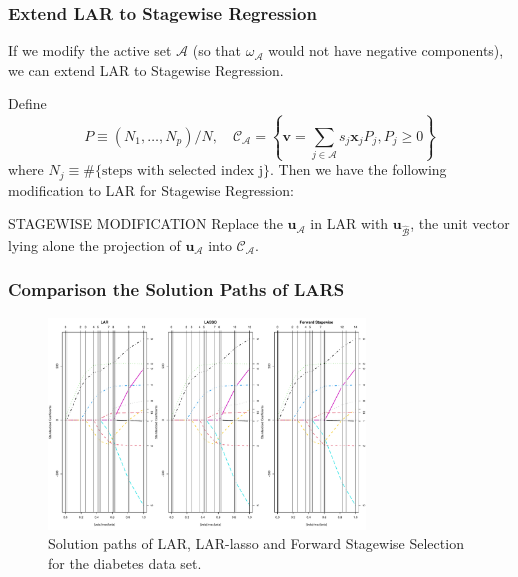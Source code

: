 \begin{frame}
\frametitle{Extend LAR to Stagewise Regression}
If we modify the active set $\mathcal{A}$ (so that $\omega_\mathcal{A}$ would not have negative components), we can extend LAR to Stagewise Regression.

Define
$$P\equiv(N_1,\dots,N_p)/N, \quad \mathcal{C}_{\mathcal{A}}=\left\{\mathbf{v}=\sum_{j\in\mathcal{A}}s_j \mathbf{x}_j P_j, P_j\geq 0\right\}$$ 
where $N_j\equiv \#\{\text{steps with selected index j}\}$. Then we have the following modification to LAR for Stagewise Regression:

\begin{block}{STAGEWISE MODIFICATION}
Replace the $\mathbf{u}_{\mathcal{A}}$ in LAR with $\mathbf{u}_{\hat{\mathcal{B}}}$, the unit vector lying alone the projection of $\mathbf{u}_{\mathcal{A}}$ into $\mathcal{C}_{\mathcal{A}}$.
\end{block}
\end{frame}

\begin{frame}
    \frametitle{Comparison the Solution Paths of LARS}
\begin{figure}[!htbp]
    \begin{center}
        \includegraphics[width=0.75\textwidth]{img/lars_diabetes.pdf}
    \end{center}
    \caption{Solution paths of LAR, LAR-lasso and Forward Stagewise Selection for the diabetes data set.}\label{fig:lars_diabetes}
\end{figure}
\end{frame}

